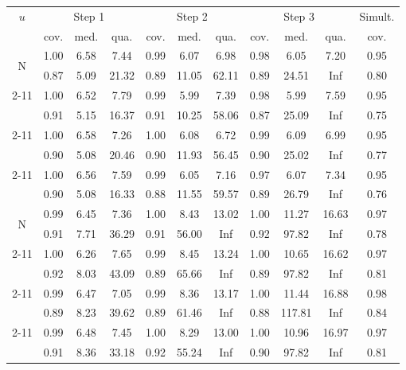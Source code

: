 \documentclass[preprint]{imsart}
\numberwithin{equation}{section}
\begin{document}
\begin{table}[h]
\begin{center}
\begin{tabular}{c|ccc|ccc|ccc|c}
$u$ & \multicolumn{3}{c}{Step 1} \vline & \multicolumn{3}{c}{Step 2} \vline & \multicolumn{3}{c}{Step 3}  & Simult. \\ 
& cov. & med. &  qua. & cov. & med. &  qua. & cov. & med. &  qua.  & cov. \\  \hline\hline
\multirow{2}{*}{N} &  1.00 & 6.58 & 7.44 & 0.99 & 6.07 & 6.98 & 0.98 & 6.05 & 7.20 & 0.95 \\ 
& 0.87 & 5.09 & 21.32 & 0.89 & 11.05 & 62.11 & 0.89 & 24.51 & Inf & 0.80 \\ \cline{2-11}
\multirow{2}{*}{L} & 1.00 & 6.52 & 7.79 & 0.99 & 5.99 & 7.39 & 0.98 & 5.99 & 7.59 & 0.95 \\
& 0.91 & 5.15 & 16.37 & 0.91 & 10.25 & 58.06 & 0.87 & 25.09 & Inf & 0.75 \\  \cline{2-11}
\multirow{2}{*}{U}  & 1.00 & 6.58 & 7.26 & 1.00 & 6.08 & 6.72 & 0.99 & 6.09 & 6.99 & 0.95 \\
& 0.90 & 5.08 & 20.46 & 0.90 & 11.93 & 56.45 & 0.90 & 25.02 & Inf & 0.77 \\  \cline{2-11}
\multirow{2}{*}{SN}  &  1.00& 6.56&  7.59 &0.99&  6.05 & 7.16 &0.97  & 6.07&  7.34 & 0.95\\
& 0.90 & 5.08 &16.33& 0.88 &11.55& 59.57& 0.89  &26.79&   Inf & 0.76 \\ \hline\hline
\multirow{2}{*}{N}  & 0.99 & 6.45 & 7.36 &1.00 & 8.43& 13.02 &1.00 & 11.27 &16.63 & 0.97 \\
& 0.91 & 7.71 & 36.29 & 0.91 & 56.00 & Inf & 0.92 & 97.82 & Inf & 0.78  \\ \cline{2-11}
\multirow{2}{*}{L}  & 1.00 & 6.26 & 7.65 & 0.99 & 8.45 & 13.24 & 1.00 & 10.65 & 16.62 & 0.97 \\
& 0.92 & 8.03 & 43.09 & 0.89 & 65.66 & Inf & 0.89 & 97.82 & Inf & 0.81 \\ \cline{2-11}
\multirow{2}{*}{U}  & 0.99 & 6.47 & 7.05 & 0.99 & 8.36 & 13.17 & 1.00 & 11.44 & 16.88 & 0.98\\
& 0.89 & 8.23 & 39.62 & 0.89 & 61.46 & Inf & 0.88 & 117.81 & Inf & 0.84\\ \cline{2-11}
\multirow{2}{*}{SN}  & 0.99 & 6.48 & 7.45 & 1.00 & 8.29 & 13.00 & 1.00 & 10.96 & 16.97 & 0.97 \\
& 0.91 & 8.36 & 33.18 & 0.92 & 55.24 & Inf & 0.90 & 97.82 & Inf & 0.81 \\ 
\end{tabular}%

\end{center}
\end{table}
\end{document}
